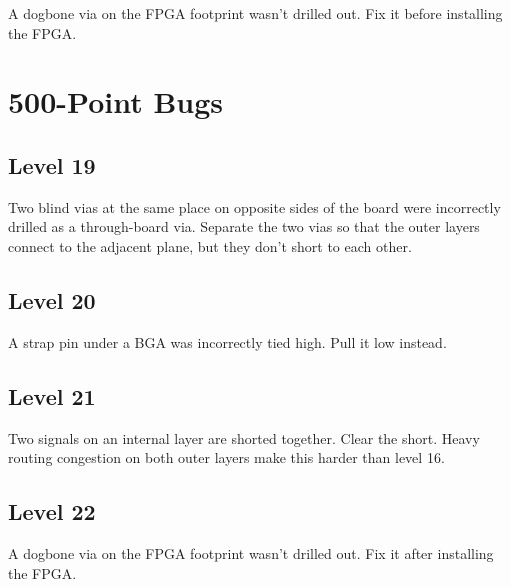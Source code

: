 \documentclass{article}
\begin{document}
A dogbone via on the FPGA footprint wasn't drilled out. Fix it before installing the FPGA.

\pagebreak
\section{500-Point Bugs}

\subsection{Level 19}

Two blind vias at the same place on opposite sides of the board were incorrectly drilled as a through-board via.
Separate the two vias so that the outer layers connect to the adjacent plane, but they don't short to each other.

\subsection{Level 20}

A strap pin under a BGA was incorrectly tied high. Pull it low instead.

\subsection{Level 21}

Two signals on an internal layer are shorted together. Clear the short. Heavy routing congestion on both outer layers
make this harder than level 16.

\subsection{Level 22}

A dogbone via on the FPGA footprint wasn't drilled out. Fix it after installing the FPGA.
\end{document}
